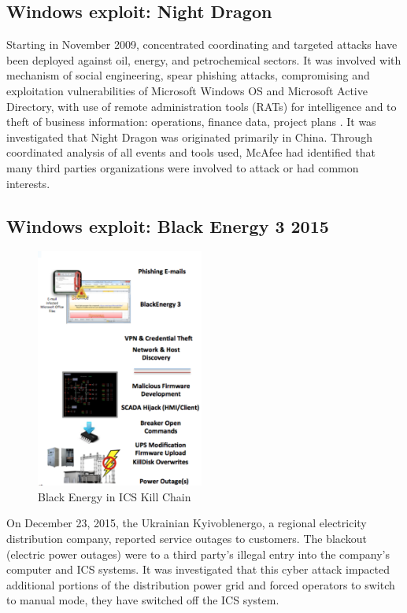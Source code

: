 \documentclass[conference]{IEEEtran}
\begin{document}
\subsection{Windows exploit: Night Dragon}
Starting in November 2009, concentrated coordinating  and targeted attacks have been deployed against
oil, energy, and petrochemical sectors. It was involved with mechanism of social engineering, spear phishing
attacks, compromising and exploitation vulnerabilities of Microsoft Windows OS and  Microsoft Active
Directory, with use of remote administration tools (RATs) for intelligence and to theft of business information: operations, finance data, project plans . It was investigated that Night Dragon was originated primarily in China. Through
coordinated analysis of all events and tools used, McAfee had identified that many third parties organizations were involved to attack or had common interests.

\subsection{Windows exploit: Black Energy 3 2015}

\begin{figure}[!htb]
	\includegraphics[width=0.49\textwidth]{images/KILLOFCHAIN.png}
	\caption{ Black Energy in ICS Kill Chain }
	\label{fig:TCPIP}
\end{figure}
 On December 23, 2015, the Ukrainian Kyivoblenergo, a regional electricity distribution company, reported service outages to customers. The blackout (electric power outages) were to a third party’s illegal entry into the company’s computer and ICS systems. It was investigated that this cyber attack impacted additional portions of the distribution power grid and forced operators to switch to manual mode, they have switched off the ICS system.
\end{document}
